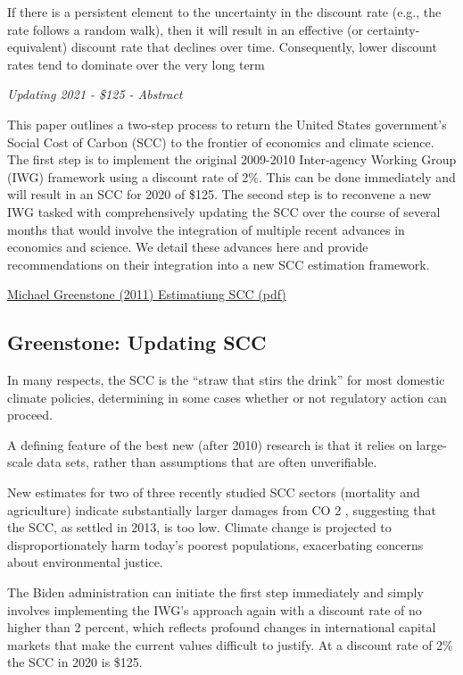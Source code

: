 \documentclass[
]{book}
\begin{document}
If there is a persistent element to the uncertainty in the discount rate (e.g., the
rate follows a random walk), then it will result in an effective (or certainty-equivalent) discount
rate that declines over time. Consequently, lower discount rates tend to dominate over the very
long term

\emph{Updating 2021 - \$125 - Abstract}

This paper outlines a two-step process to return the United States government's
Social Cost of Carbon (SCC) to the frontier of economics and climate science.
The first step is to implement the original 2009-2010 Inter-agency Working
Group (IWG) framework using a discount rate of 2\%. This can be done
immediately and will result in an SCC for 2020 of \$125. The second step is to
reconvene a new IWG tasked with comprehensively updating the SCC over the
course of several months that would involve the integration of multiple recent
advances in economics and science. We detail these advances here and provide
recommendations on their integration into a new SCC estimation framework.

\href{pdf/Greenestone_2011_Estimating_SCC.pdf}{Michael Greenstone (2011) Estimatiung SCC (pdf)}

\hypertarget{greenstone-updating-scc}{%
\subsection{Greenstone: Updating SCC}\label{greenstone-updating-scc}}

In many respects, the SCC is the ``straw that stirs the drink'' for most domestic climate
policies, determining in some cases whether or not regulatory action can proceed.

A defining feature of the best new (after 2010) research is that it relies on large-scale data
sets, rather than assumptions that are often unverifiable.

New estimates for two of three recently studied SCC
sectors (mortality and agriculture) indicate substantially larger damages from CO 2 ,
suggesting that the SCC, as settled in 2013, is too low.
Climate change is projected to disproportionately
harm today's poorest populations, exacerbating concerns about environmental justice.

The Biden administration can initiate the first step immediately
and simply involves implementing the IWG's approach again with a discount rate of no
higher than 2 percent, which reflects profound changes in international capital markets
that make the current values difficult to justify. At a discount rate of 2\% the SCC in
2020 is \$125.
\end{document}
